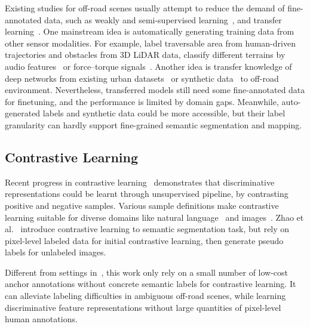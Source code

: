 \documentclass[letterpaper, 10 pt, conference]{ieeeconf}  %
\begin{document}
Existing studies for off-road scenes usually attempt to reduce the demand of fine-annotated data, such as weakly and semi-supervised learning~\cite{suger2015traversability}\cite{gao2019off}, and transfer learning~\cite{holder2016road}\cite{sharma2019semantic}. 
One mainstream idea is automatically generating training data from other sensor modalities. For example, label traversable area from human-driven trajectories and obstacles from 3D LiDAR data\cite{tang2017one}\cite{gao2019off}, classify different terrains by audio features~\cite{zurn2020self} or force–torque signals~\cite{wellhausen2019should}.
Another idea is transfer knowledge of deep networks from existing urban datasets~\cite{holder2016road} or synthetic data~\cite{sharma2019semantic} to off-road environment.
Nevertheless, transferred models still need some fine-annotated data for finetuning, and the performance is limited by domain gaps. Meanwhile, auto-generated labels and synthetic data could be more accessible, but their label granularity can hardly support fine-grained semantic segmentation and mapping.

\subsection{Contrastive Learning}
Recent progress in contrastive learning~\cite{oord2018CPC}\cite{chen2020simple}\cite{he2020momentum} demonstrates that discriminative representations could be learnt through unsupervised pipeline, by contrasting positive and negative samples. Various sample definitions make contrastive learning suitable for diverse domains like natural language~\cite{oord2018CPC} and images~\cite{tian2019contrastive}. 
Zhao et al.~\cite{zhao2020contrastive} introduce contrastive learning to semantic segmentation task, but rely on pixel-level labeled data for initial contrastive learning, then generate pseudo labels for unlabeled images.

Different from settings in~\cite{zhao2020contrastive}, this work only rely on a small number of low-cost anchor annotations without concrete semantic labels for contrastive learning. It can alleviate labeling difficulties in ambiguous off-road scenes, while learning discriminative feature representations without large quantities of pixel-level human annotations.
\end{document}
